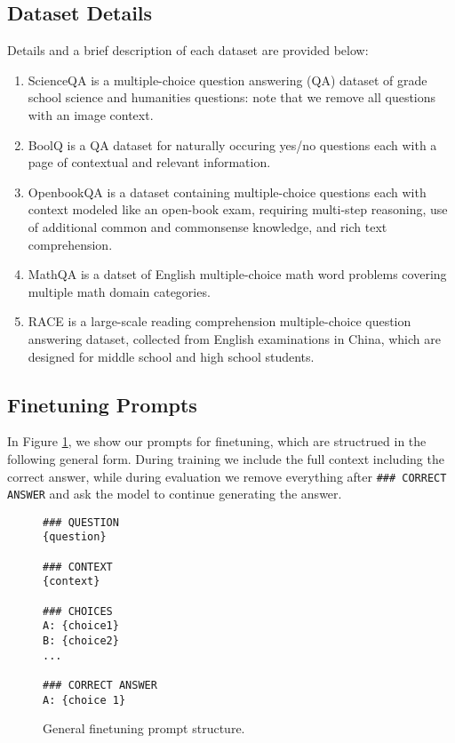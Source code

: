 \subsection{Dataset Details}
Details and a brief description of each dataset are provided below:
\begin{enumerate}
    \item ScienceQA \cite{lu2022learn} is a multiple-choice question answering (QA) dataset of grade school science and humanities questions: note that we remove all questions with an image context.
    \item BoolQ \cite{clark2019boolqexploringsurprisingdifficulty} is a QA dataset for naturally occuring yes/no questions each with a page of contextual and relevant information.
    \item OpenbookQA \cite{OpenBookQA2018} is a dataset containing multiple-choice questions each with context modeled like an open-book exam, requiring multi-step reasoning, use of additional common and commonsense knowledge, and rich text comprehension. 
    \item MathQA \cite{mathqadataset} is a datset of English multiple-choice math word problems covering multiple math domain categories.
    \item RACE \cite{raceLai2017large} is a large-scale reading comprehension multiple-choice question answering dataset, collected from English examinations in China, which are designed for middle school and high school students. 
\end{enumerate}

\subsection{Finetuning Prompts}
In Figure \ref{fig:finetuning_prompt_structure}, we show our prompts for finetuning, which are structrued in the following general form. During training we include the full context including the correct answer, while during evaluation we remove everything after \verb|### CORRECT ANSWER| and ask the model to continue generating the answer.
\begin{figure}[htbp]
    \begin{longfbox}[title=Finetuning Prompt Structure]{}
    \begin{small}
    \begin{verbatim}
### QUESTION
{question}

### CONTEXT
{context}

### CHOICES
A: {choice1}
B: {choice2}
...

### CORRECT ANSWER
A: {choice 1}
\end{verbatim}
    \end{small}
    \end{longfbox}
    \caption{General finetuning prompt structure. }
    \label{fig:finetuning_prompt_structure}
\end{figure}


